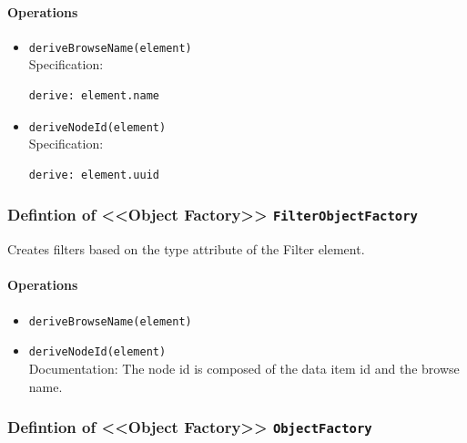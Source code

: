 \paragraph{Operations}
\begin{itemize}
  \item \texttt{deriveBrowseName(element)}\\
    Specification:
   \indent \begin{Verbatim}[xleftmargin=.25in,fontsize=\small]
derive: element.name
\end{Verbatim}

  \item \texttt{deriveNodeId(element)}\\
    Specification:
   \indent \begin{Verbatim}[xleftmargin=.25in,fontsize=\small]
derive: element.uuid
\end{Verbatim}

\end{itemize}
\subsubsection{Defintion of <<Object Factory>> \texttt{FilterObjectFactory}} \label{type:FilterObjectFactory}

\FloatBarrier

Creates filters based on the type attribute of the Filter element. 

\paragraph{Operations}
\begin{itemize}
  \item \texttt{deriveBrowseName(element)}
  \item \texttt{deriveNodeId(element)}\\
    Documentation: The node id is composed of the data item id and the browse name.

\end{itemize}
\subsubsection{Defintion of <<Object Factory>> \texttt{ObjectFactory}} \label{type:ObjectFactory}

\FloatBarrier




